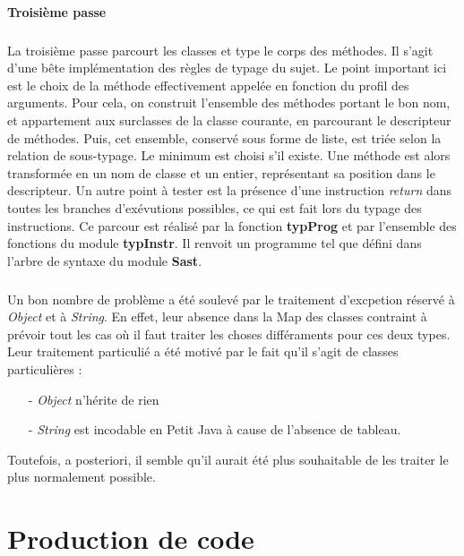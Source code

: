 \documentclass{article}
\begin{document}
\paragraph{Troisième passe}
\subparagraph*{}
La troisième passe parcourt les classes et type le corps des méthodes. Il s'agit d'une bête implémentation des règles de typage du sujet. Le point important ici est le choix de la méthode effectivement appelée en fonction du profil des arguments. Pour cela, on construit l'ensemble des méthodes portant le bon nom, et appartement aux surclasses de la classe courante, en parcourant le descripteur de méthodes. Puis, cet ensemble, conservé sous forme de liste, est triée selon la relation de sous-typage. Le minimum est choisi s'il existe. Une méthode est alors transformée en un nom de classe et un entier, représentant sa position dans le descripteur. Un autre point à tester est la présence d'une instruction \emph{return} dans toutes les branches d'exévutions possibles, ce qui est fait lors du typage des instructions. Ce parcour est réalisé par la fonction \textbf{typProg} et par l'ensemble des fonctions du module \textbf{typInstr}. Il renvoit un programme tel que défini dans l'arbre de syntaxe du module \textbf{Sast}.

\subparagraph*{} Un bon nombre de problème a été soulevé par le traitement d'excpetion réservé à \emph{Object} et à \emph{String}. En effet, leur absence dans la Map des classes contraint à prévoir tout les cas où il faut traiter les choses différaments pour ces deux types. Leur traitement particulié a été motivé par le fait qu'il s'agit de classes particulières : 
\begin{itemize}
\item[-] \emph{Object} n'hérite de rien
\item[-] \emph{String} est incodable en Petit Java à cause de l'absence de tableau.
\end{itemize}
Toutefois, a posteriori, il semble qu'il aurait été plus souhaitable de les traiter le plus normalement possible. 

\section{Production de code}
\end{document}
